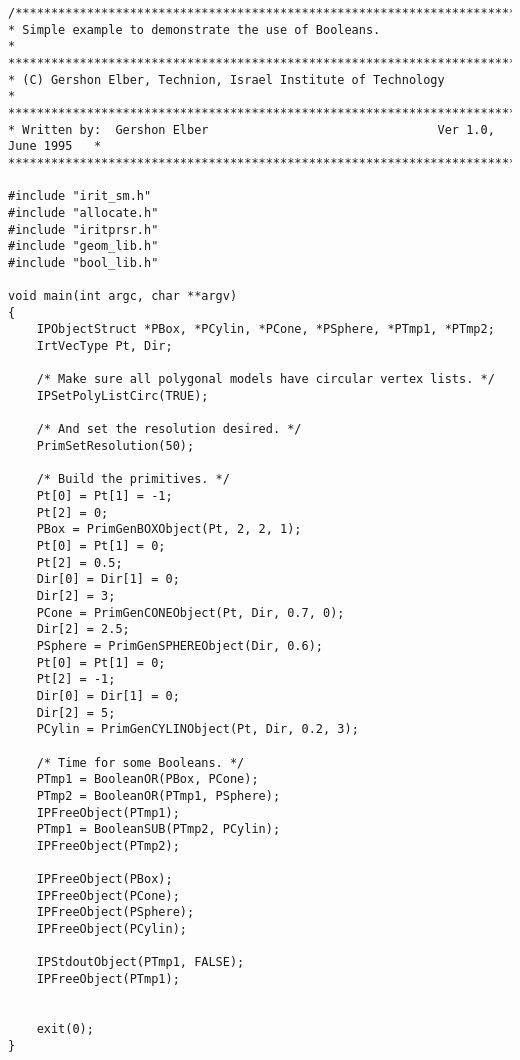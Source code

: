 \begin{verbatim}
/*****************************************************************************
* Simple example to demonstrate the use of Booleans.                             *
******************************************************************************
* (C) Gershon Elber, Technion, Israel Institute of Technology                *
******************************************************************************
* Written by:  Gershon Elber                                Ver 1.0, June 1995   *
*****************************************************************************/

#include "irit_sm.h"
#include "allocate.h"
#include "iritprsr.h"
#include "geom_lib.h"
#include "bool_lib.h"

void main(int argc, char **argv)
{
    IPObjectStruct *PBox, *PCylin, *PCone, *PSphere, *PTmp1, *PTmp2;
    IrtVecType Pt, Dir;

    /* Make sure all polygonal models have circular vertex lists. */
    IPSetPolyListCirc(TRUE);

    /* And set the resolution desired. */
    PrimSetResolution(50);

    /* Build the primitives. */
    Pt[0] = Pt[1] = -1;
    Pt[2] = 0;
    PBox = PrimGenBOXObject(Pt, 2, 2, 1);
    Pt[0] = Pt[1] = 0;
    Pt[2] = 0.5;
    Dir[0] = Dir[1] = 0;
    Dir[2] = 3;
    PCone = PrimGenCONEObject(Pt, Dir, 0.7, 0);
    Dir[2] = 2.5;
    PSphere = PrimGenSPHEREObject(Dir, 0.6);
    Pt[0] = Pt[1] = 0;
    Pt[2] = -1;
    Dir[0] = Dir[1] = 0;
    Dir[2] = 5;
    PCylin = PrimGenCYLINObject(Pt, Dir, 0.2, 3);

    /* Time for some Booleans. */
    PTmp1 = BooleanOR(PBox, PCone);
    PTmp2 = BooleanOR(PTmp1, PSphere);
    IPFreeObject(PTmp1);
    PTmp1 = BooleanSUB(PTmp2, PCylin);
    IPFreeObject(PTmp2);

    IPFreeObject(PBox);
    IPFreeObject(PCone);
    IPFreeObject(PSphere);
    IPFreeObject(PCylin);

    IPStdoutObject(PTmp1, FALSE);
    IPFreeObject(PTmp1);


    exit(0);
}
\end{verbatim}
